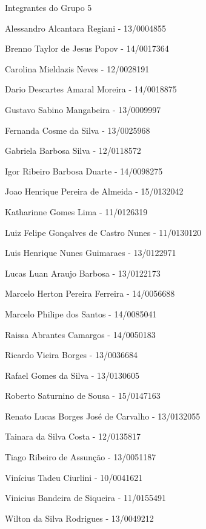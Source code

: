 \begin{folhadeaprovacao}

  \begin{center}
    {\ABNTEXchapterfont\large\imprimirautor}

    \vspace*{\fill}\vspace*{\fill}
    {\ABNTEXchapterfont\bfseries\Large\imprimirtitulo}
    \vspace*{\fill}

    Integrantes do Grupo 5

   \end{center}

   Alessandro Alcantara Regiani - 13/0004855 

   Brenno Taylor de Jesus Popov - 14/0017364 

   Carolina Mieldazis Neves - 12/0028191 

   Dario Descartes Amaral Moreira - 14/0018875 

   Gustavo Sabino Mangabeira - 13/0009997 

   Fernanda Cosme da Silva - 13/0025968 

   Gabriela Barbosa Silva - 12/0118572 

   Igor Ribeiro Barbosa Duarte - 14/0098275 

   Joao Henrique Pereira de Almeida - 15/0132042 

   Katharinne Gomes Lima - 11/0126319 

   Luiz Felipe Gonçalves de Castro Nunes - 11/0130120 

   Luis Henrique Nunes Guimaraes - 13/0122971 

   Lucas Luan Araujo Barbosa - 13/0122173 

   Marcelo Herton Pereira Ferreira - 14/0056688 

   Marcelo Philipe dos Santos - 14/0085041 

   Raissa Abrantes Camargos - 14/0050183 

   Ricardo Vieira Borges - 13/0036684 

   Rafael Gomes da Silva - 13/0130605 

   Roberto Saturnino de Sousa - 15/0147163 

   Renato Lucas Borges José de Carvalho - 13/0132055 

   Tainara da Silva Costa - 12/0135817 

   Tiago Ribeiro de Assunção - 13/0051187 

   Vinícius Tadeu Ciurlini - 10/0041621 

   Vinicius Bandeira de Siqueira - 11/0155491 

  Wilton da Silva Rodrigues - 13/0049212 

\end{folhadeaprovacao}
